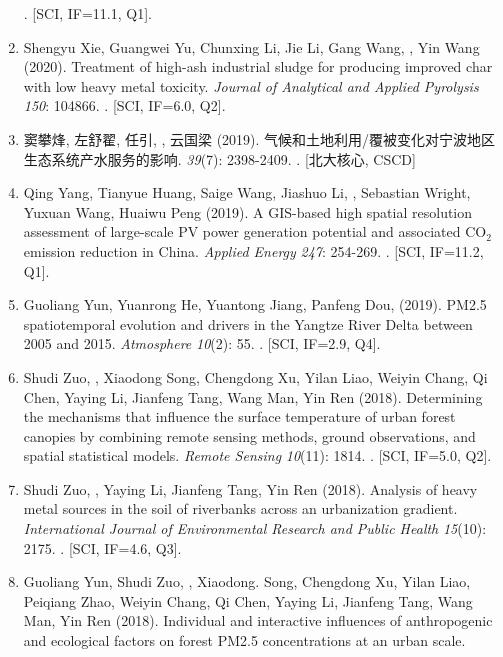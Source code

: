 \begin{enumerate}
    . [SCI, IF=11.1, Q1].
\item
    Shengyu Xie, Guangwei Yu, Chunxing Li, Jie Li, Gang Wang, \Shaoqing, Yin Wang (2020).
    Treatment of high-ash industrial sludge for producing improved char with low heavy metal toxicity.
    \textit{Journal of Analytical and Applied Pyrolysis} \textit{150}: 104866.
    . [SCI, IF=6.0, Q2].
\item
    窦攀烽, 左舒翟, 任引, {}, 云国梁 (2019).
    气候和土地利用/覆被变化对宁波地区生态系统产水服务的影响.
    {} \textit{39}(7): 2398-2409.
    . [北大核心, CSCD] 
\item
    Qing Yang, Tianyue Huang, Saige Wang, Jiashuo Li, \Shaoqing, Sebastian Wright, Yuxuan Wang, Huaiwu Peng (2019).
    A GIS-based high spatial resolution assessment of large-scale PV power generation potential and associated CO$_2$ emission reduction in China.
    \textit{Applied Energy} \textit{247}: 254-269.
    . [SCI, IF=11.2, Q1].
\item
    Guoliang Yun, Yuanrong He, Yuantong Jiang, Panfeng Dou, \Shaoqing \enspace (2019).
    PM2.5 spatiotemporal evolution and drivers in the Yangtze River Delta between 2005 and 2015.
    \textit{Atmosphere} \textit{10}(2): 55.
    . [SCI, IF=2.9, Q4].
\item
    Shudi Zuo, \Shaoqing, Xiaodong Song, Chengdong Xu, Yilan Liao, Weiyin Chang, Qi Chen, Yaying Li, Jianfeng Tang, Wang Man, Yin Ren (2018).
    Determining the mechanisms that influence the surface temperature of urban forest canopies by combining remote sensing methods, ground observations, and spatial statistical models. 
    \textit{Remote Sensing} \textit{10}(11): 1814.
    . [SCI, IF=5.0, Q2].
\item
    Shudi Zuo, \Shaoqing, Yaying Li, Jianfeng Tang, Yin Ren (2018).
	Analysis of heavy metal sources in the soil of riverbanks across an urbanization gradient.
    \textit{International Journal of Environmental Research and Public Health} \textit{15}(10): 2175.
    . [SCI, IF=4.6, Q3].
\item
    Guoliang Yun, Shudi Zuo, \Shaoqing, Xiaodong. Song, Chengdong Xu, Yilan Liao, Peiqiang Zhao, Weiyin Chang, Qi Chen, Yaying Li, Jianfeng Tang, Wang Man, Yin Ren (2018).
	Individual and interactive influences of anthropogenic and ecological factors on forest PM2.5 concentrations at an urban scale.

\end{enumerate}
